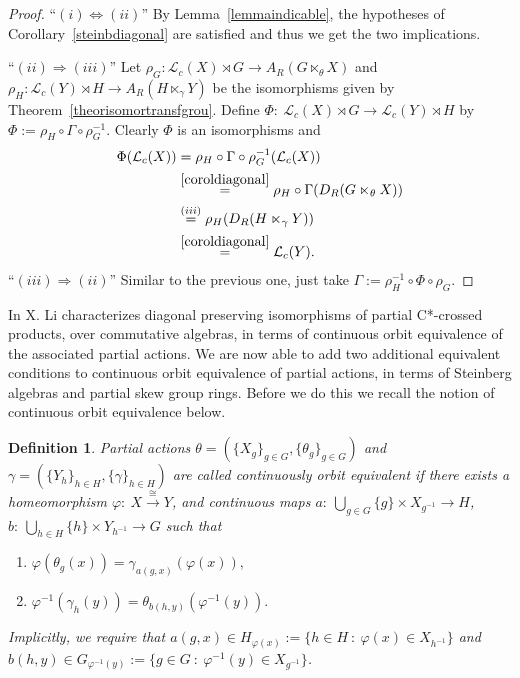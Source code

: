 \documentclass[11pt, a4paper]{amsart}
\newcommand{\Gx}{\ensuremath {G \ltimes_\theta X}}
\newcommand{\Lc}{\ensuremath {\mathcal{L}_c(X)}}
\newcommand{\an}[1]{``#1''} %
\theoremstyle{plain}
\newtheorem{definition}[theorem]{Definition}
\begin{document}
\begin{proof}
\an{$(i) \Leftrightarrow (ii)$} By Lemma~\ref{lemmaindicable}, the hypotheses of Corollary~\ref{steinbdiagonal} are satisfied and thus we get the two implications.

\an{$(ii) \Rightarrow (iii)$} Let $\rho_G: \mathcal{L}_c(X)\rtimes G \longrightarrow A_R(\Gx)$ and $\rho_H : \mathcal{L}_c(Y)\rtimes H \longrightarrow  A_R(H \ltimes_\gamma Y)$ be the isomorphisms given by Theorem~\ref{theorisomortransfgrou}. Define $\Phi: \ \mathcal{L}_c(X)\rtimes G \longrightarrow \mathcal{L}_c(Y)\rtimes H$ by $\Phi:= \rho_H \circ \Gamma \circ \rho_G^{-1}.$ Clearly $\Phi$ is an isomorphisms and
\begin{align*}
\Phi(\Lc) & = \rho_H \circ \Gamma \circ \rho_G^{-1}(\Lc) \\
          & \stackrel{\ref{coroldiagonal}}{=}\rho_H \circ \Gamma (D_R(\Gx)) \\
          & \stackrel{(iii)}{=} \rho_H (D_R( H \ltimes_\gamma Y))\\
          & \stackrel{\ref{coroldiagonal}}{=} \mathcal{L}_c(Y).
\end{align*}
\an{$(iii) \Rightarrow (ii)$} Similar to the previous one, just take $\Gamma:=\rho_H^{-1} \circ \Phi \circ \rho_G.$ 
\end{proof}



In \cite[Theorem~2.7]{Xin} X. Li characterizes diagonal preserving isomorphisms of partial C*-crossed products, over commutative algebras, in terms of continuous orbit equivalence of the associated partial actions. We are now able to add two additional equivalent conditions to continuous orbit equivalence of partial actions, in terms of Steinberg algebras and partial skew group rings. Before we do this we recall the notion of continuous orbit equivalence below.


\begin{definition}
Partial actions $\theta=(\{X_g\}_{g \in G}, \{\theta_g\}_{g \in G})$ and $\gamma=(\{Y_h\}_{h \in H}, \{\gamma\}_{h \in H})$ are called continuously orbit equivalent if there exists a homeomorphism $\varphi: \: X \stackrel{\cong}{\longrightarrow} Y$, and continuous maps $a: \: \bigcup_{g \in G} \{g\} \times X_{g^{-1}} \longrightarrow H$, $b: \: \bigcup_{h \in H} \{h\} \times Y_{h^{-1}} \longrightarrow G$  such that
\begin{enumerate}[{\rm (i)}]
\item $ \varphi(\theta_g(x)) = \gamma_{a(g,x)}(\varphi(x)), $
\item $ \varphi^{-1}(\gamma_h(y)) = \theta_{b(h,y)}(\varphi^{-1}(y)).$
\end{enumerate}
Implicitly, we require that $a(g,x) \in H_{\varphi(x)}:=\{ h \in H \ : \ \varphi(x) \in X_{h^{-1}}\}$ and $b(h,y) \in G_{\varphi^{-1}(y)}:= \{ g \in G \ : \ \varphi^{-1}(y) \in  X_{g^{-1}}\}$.
\end{definition}
\end{document}

